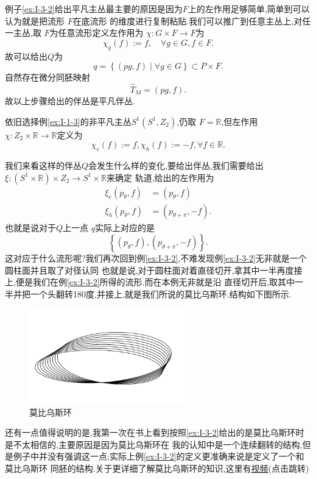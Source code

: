 \documentclass[../main.tex]{subfiles}
\begin{document}
 例子\ref{ex:I-3-2}给出平凡主丛最主要的原因是因为$F$上的左作用足够简单,简单到可以认为就是把流形 $F$在底流形
 的维度进行复制粘贴.我们可以推广到任意主丛上,对任一主丛,取 $F$为任意流形定义左作用为 $\chi:G \times F \to F$为
 \[
 \chi_g(f) := f , \quad \forall g \in G, f\in F
 .\]故可以给出$Q$为 \[
 q = \left\{ (pg,f) \mid  \forall g \in G \right\} \subset P\times F
 .\] 自然存在微分同胚映射\[
 \hat{T}_M=(pg,f)
 .\] 
 故以上步骤给出的伴丛是平凡伴丛.
 \begin{example}
   \label{ex:I-3-3}
   依旧选择例\ref{ex:I-1-3}的非平凡主丛$S^1(S^1,Z_2)$,仍取 $F = \mathbb{R}$,但左作用 $\chi:Z_2 \times \mathbb{R} \to \mathbb{R}$定义为\[
     \chi_e(f):= f, \chi_h(f) := -f , \forall f \in \mathbb{R}
   .\] 
 \end{example}
 我们来看这样的伴丛$Q$会发生什么样的变化,要给出伴丛,我们需要给出$\xi:\left( S^1 \times \mathbb{R} \right) \times Z_2 \to S^1 \times \mathbb{R}$来确定
 轨道,给出的左作用为
 \begin{align*}
   \xi_e(p_\theta,f) & = (p_\theta, f)\\
   \xi_h(p_\theta, f) & = (p_{\theta +\pi} , -f)
 .\end{align*}
 也就是说对于$Q$上一点 $q$实际上对应的是 \[
   \left\{ (p_\theta,f), (p_{\theta + \pi}, -f) \right\} 
 .\] 
 这对应于什么流形呢?我们再次回到例\ref{ex:I-3-2},不难发现例\ref{ex:I-3-2}无非就是一个圆柱面并且取了对径认同
 也就是说,对于圆柱面对着直径切开,拿其中一半再度接上,便是我们在例\ref{ex:I-3-2}所得的流形.而在本例无非就是沿
 直径切开后,取其中一半并把一个头翻转180度,并接上,就是我们所说的莫比乌斯环.结构如下图所示.
 \begin{figure}[htpb]
   \centering
   \includegraphics[width=0.6\textwidth]{../tikzpicture/I33.pdf}
   \caption{莫比乌斯环}
   \label{fig:I-3-3}
 \end{figure}
 \begin{note}
   还有一点值得说明的是,我第一次在书上看到按照\ref{ex:I-3-2}给出的是莫比乌斯环时是不太相信的,主要原因是因为莫比乌斯环在
   我的认知中是一个连续翻转的结构,但是例子中并没有强调这一点;实际上例\ref{ex:I-3-2}的定义更准确来说是定义了一个和莫比乌斯环
   同胚的结构.关于更详细了解莫比乌斯环的知识,这里有\href{https://www.bilibili.com/video/BV1u5NAefE9W}{视频}(点击跳转)
 \end{note}
\end{document}
